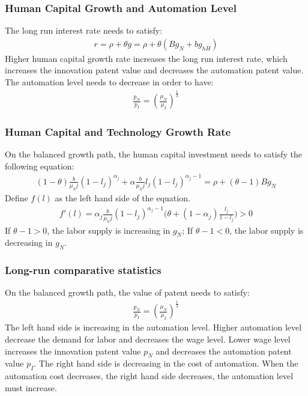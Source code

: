 \documentclass[12pt]{article}
\begin{document}
\begin{appendices}
\subsubsection*{Human Capital Growth and Automation Level}
The long run interest rate needs to satisfy: 
\begin{align*}
r = \rho+\theta g = \rho+\theta(Bg_N+bg_{hH})
\end{align*}
Higher human capital growth rate increases the long run interest rate, which increases the innovation patent value and decreases the automation patent value. The automation level needs to decrease in order to have: 
\begin{align*}
\frac{p_N}{p_I} = (\frac{\mu_N}{\mu_I})^{\frac{1}{\lambda}}
\end{align*} 
 
\subsubsection*{Human Capital and Technology Growth Rate}
On the balanced growth path, the human capital investment needs to satisfy the following equation: 
\begin{align*}
(1-\theta)\frac{b}{\mu_hj}(1-l_j)^{\alpha_j}+\alpha\frac{b}{\mu_hj}l_j(1-l_j)^{\alpha_j-1} = \rho+(\theta-1)Bg_N
\end{align*}
Define $f(l)$ as the left hand side of the equation. 
\begin{align*}
f'(l) = \alpha_j\frac{b}{\mu_hj}(1-l_j)^{\alpha_j-1}\big(\theta+(1-\alpha_j)\frac{l_j}{1-l_j}\big)>0
\end{align*}
If $\theta-1>0$, the labor supply is increasing in $g_N$; If $\theta-1<0$, the labor supply is decreasing in $g_N$. 

\subsubsection*{Long-run comparative statistics}
On the balanced growth path, the value of patent needs to satisfy: 
\begin{align*}
\frac{p_N}{p_I} = (\frac{\mu_N}{\mu_I})^{\frac{1}{\lambda}}
\end{align*} 
The left hand side is increasing in the automation level. Higher automation level decrease the demand for labor and decreases the wage level. Lower wage level increases the innovation patent value $p_N$ and decreases the automation patent value $p_I$. The right hand side is decreasing in the cost of automation. When the automation cost decreases, the right hand side decreases, the automation level must increase. 


\end{appendices}
\end{document}
